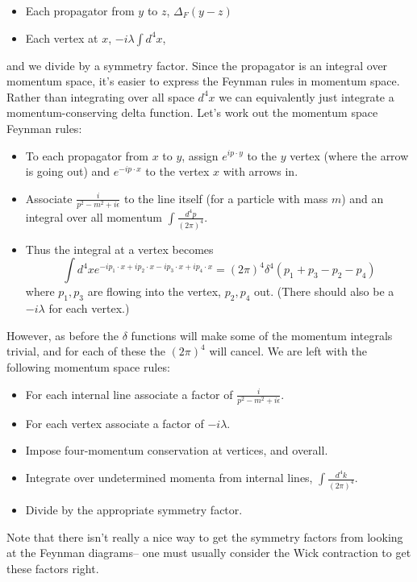 \begin{itemize}
    \item Each propagator from $y$ to $z$, $\Delta_F(y-z)$
    \item Each vertex at $x$, $-i\lambda \int d^4 x$,
\end{itemize}
and we divide by a symmetry factor. Since the propagator is an integral over momentum space, it's easier to express the Feynman rules in momentum space. Rather than integrating over all space $d^4x$ we can equivalently just integrate a momentum-conserving delta function. Let's work out the momentum space Feynman rules:
\begin{itemize}
    \item To each propagator from $x$ to $y$, assign $e^{ip \cdot y}$ to the $y$ vertex (where the arrow is going out) and $e^{-ip\cdot x}$ to the vertex $x$ with arrows in. 
    \item Associate $\frac{i}{p^2-m^2+i\epsilon}$ to the line itself (for a particle with mass $m$) and an integral over all momentum $\int \frac{d^4p}{(2\pi)^4}.$ 
    \item Thus the integral at a vertex becomes
    $$\int d^4x e^{-ip_1 \cdot x + i p_2 \cdot x - i p_3 \cdot x + i p_4 \cdot x}=(2\pi)^4 \delta^4(p_1+p_3-p_2-p_4)$$
    where $p_1,p_3$ are flowing into the vertex, $p_2,p_4$ out. (There should also be a $-i\lambda$ for each vertex.)
\end{itemize}

However, as before the $\delta$ functions will make some of the momentum integrals trivial, and for each of these the $(2\pi)^4$ will cancel. We are left with the following momentum space rules:
\begin{itemize}
    \item For each internal line associate a factor of $\frac{i}{p^2-m^2+i\epsilon}$.
    \item For each vertex associate a factor of $-i\lambda$.
    \item Impose four-momentum conservation at vertices, and overall.
    \item Integrate over undetermined momenta from internal lines, $\int \frac{d^4k}{(2\pi)^4}$.
    \item Divide by the appropriate symmetry factor.
\end{itemize}
Note that there isn't really a nice way to get the symmetry factors from looking at the Feynman diagrams-- one must usually consider the Wick contraction to get these factors right.

